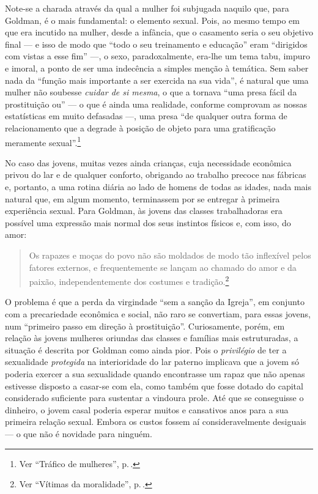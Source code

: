 Note-se a charada através da qual a mulher
foi subjugada naquilo que, para Goldman, é o mais fundamental: o elemento
sexual. Pois, ao mesmo tempo em que era incutido na mulher, desde a
infância, que o casamento seria o seu objetivo final --- e isso de modo
que ``todo o seu treinamento e educação'' eram ``dirigidos com vistas a
esse fim'' ---, o sexo, paradoxalmente, era-lhe um tema tabu, impuro e
imoral, a ponto de ser uma indecência a simples menção à temática. Sem
saber nada da ``função mais importante a ser exercida na sua vida'',
é natural que uma mulher não soubesse \textit{cuidar de si mesma}, o que a tornava ``uma presa
fácil da prostituição ou'' --- o que é ainda uma realidade, conforme
comprovam as nossas estatísticas em muito defasadas ---, uma presa ``de
qualquer outra forma de relacionamento que a degrade à posição de
objeto para uma gratificação meramente sexual''.\footnote{Ver ``Tráfico de mulheres'', p.\,\pageref{objeto}.}

No caso das jovens, muitas vezes ainda crianças, cuja necessidade
econômica privou do lar e de qualquer conforto, obrigando ao trabalho
precoce nas fábricas e, portanto, a uma rotina diária ao lado de homens
de todas as idades, nada mais natural que, em algum momento, terminassem
por se entregar à primeira experiência sexual. Para Goldman, às jovens
das classes trabalhadoras era possível uma expressão mais normal dos
seus instintos físicos e, com isso, do amor:

\begin{quote}
Os rapazes e moças do povo não são moldados de modo
tão inflexível pelos fatores externos, e frequentemente se lançam ao
chamado do amor e da paixão, independentemente dos costumes e tradição.\footnote{Ver ``Vítimas da moralidade'', p.\,\pageref{tradicao}.}
\end{quote}

O problema é que a perda da virgindade ``sem a sanção da
Igreja'', em conjunto com a precariedade econômica e social, não raro se
convertiam, para essas jovens, num ``primeiro passo em direção à
prostituição''. Curiosamente, porém, em relação às jovens
mulheres oriundas das classes e famílias mais estruturadas, a situação é
descrita por Goldman como ainda pior. Pois o \textit{privilégio} de ter a
sexualidade \textit{protegida} na interioridade do lar paterno implicava que
a jovem só poderia exercer a sua sexualidade quando
encontrasse um rapaz que não apenas estivesse disposto a casar-se com
ela, como também que fosse dotado do capital considerado
suficiente para sustentar a vindoura prole. Até que se conseguisse o
dinheiro, o jovem casal poderia esperar muitos e
cansativos anos para a sua primeira relação sexual. Embora os
custos fossem aí consideravelmente desiguais --- o que não é novidade
para ninguém.

